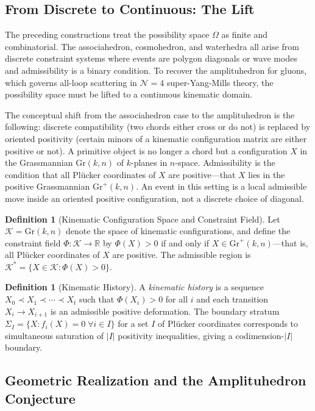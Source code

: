 \documentclass[12pt, oneside]{amsart}
\theoremstyle{plain}
\theoremstyle{definition}
\newtheorem{definition}[theorem]{Definition}
\theoremstyle{remark}
\newcommand{\R}{\mathbb{R}}
\newcommand{\Gr}{\mathrm{Gr}}
\newcommand{\Phif}{\Phi}
\newcommand{\OmKS}{\Omega}
\begin{document}
\subsection{From Discrete to Continuous: The Lift}

The preceding constructions treat the possibility space $\OmKS$ as finite and combinatorial. The associahedron, cosmohedron, and waterhedra all arise from discrete constraint systems where events are polygon diagonals or wave modes and admissibility is a binary condition. To recover the amplituhedron for gluons, which governs all-loop scattering in $\mathcal{N}=4$ super-Yang-Mills theory, the possibility space must be lifted to a continuous kinematic domain.

The conceptual shift from the associahedron case to the amplituhedron is the following: discrete compatibility (two chords either cross or do not) is replaced by oriented positivity (certain minors of a kinematic configuration matrix are either positive or not). A primitive object is no longer a chord but a configuration $X$ in the Grassmannian $\Gr(k,n)$ of $k$-planes in $n$-space. Admissibility is the condition that all Pl\"ucker coordinates of $X$ are positive---that $X$ lies in the positive Grassmannian $\mathrm{Gr}^+(k,n)$. An event in this setting is a local admissible move inside an oriented positive configuration, not a discrete choice of diagonal.

\begin{definition}[Kinematic Configuration Space and Constraint Field]
Let $\mathcal{K} = \Gr(k,n)$ denote the space of kinematic configurations, and define the constraint field $\Phif: \mathcal{K} \to \R$ by $\Phif(X) > 0$ if and only if $X \in \mathrm{Gr}^+(k,n)$---that is, all Pl\"ucker coordinates of $X$ are positive. The admissible region is $\mathcal{K}^* = \{X \in \mathcal{K} : \Phif(X) > 0\}$.
\end{definition}

\begin{definition}[Kinematic History]
A \emph{kinematic history} is a sequence $X_0 \prec X_1 \prec \cdots \prec X_t$ such that $\Phif(X_i) > 0$ for all $i$ and each transition $X_i \to X_{i+1}$ is an admissible positive deformation. The boundary stratum $\Sigma_I = \{X : f_i(X) = 0 \; \forall i \in I\}$ for a set $I$ of Pl\"ucker coordinates corresponds to simultaneous saturation of $|I|$ positivity inequalities, giving a codimension-$|I|$ boundary.
\end{definition}

\subsection{Geometric Realization and the Amplituhedron Conjecture}
\end{document}
